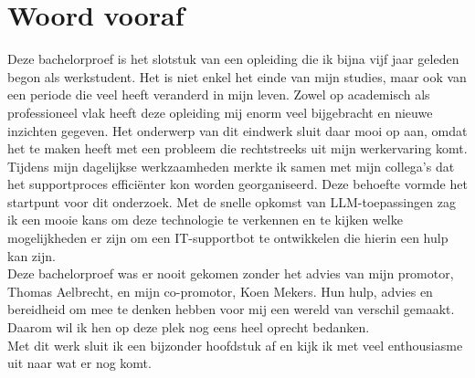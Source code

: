 
\chapter{Woord vooraf}
\label{ch:voorwoord}

Deze bachelorproef is het slotstuk van een opleiding die ik bijna vijf jaar geleden begon als werkstudent. Het is niet enkel het einde van mijn studies, maar ook van een periode die veel heeft veranderd in mijn leven. Zowel op academisch als professioneel vlak heeft deze opleiding mij enorm veel bijgebracht en nieuwe inzichten gegeven. Het onderwerp van dit eindwerk sluit daar mooi op aan, omdat het te maken heeft met een probleem die rechtstreeks uit mijn werkervaring komt.
\\[1em]
Tijdens mijn dagelijkse werkzaamheden merkte ik samen met mijn collega’s dat het supportproces efficiënter kon worden georganiseerd. Deze behoefte vormde het startpunt voor dit onderzoek. Met de snelle opkomst van LLM-toepassingen zag ik een mooie kans om deze technologie te verkennen en te kijken welke mogelijkheden er zijn om een IT-supportbot te ontwikkelen die hierin een hulp kan zijn.
\\[1em]
Deze bachelorproef was er nooit gekomen zonder het advies van mijn promotor, Thomas Aelbrecht, en mijn co-promotor, Koen Mekers. Hun hulp, advies en bereidheid om mee te denken hebben voor mij een wereld van verschil gemaakt. Daarom wil ik hen op deze plek nog eens heel oprecht bedanken.
\\[1em]
Met dit werk sluit ik een bijzonder hoofdstuk af en kijk ik met veel enthousiasme uit naar wat er nog komt.





